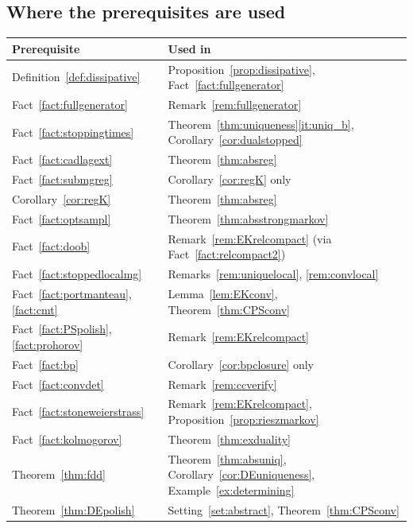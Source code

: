 \documentclass[11pt,a4paper]{article}
\theoremstyle{plain}
\theoremstyle{definition}
\theoremstyle{remark}
\begin{document}
\subsection{Where the prerequisites are used}
\label{ssec:usage}

\noindent
\begin{tabular}{@{}ll@{}}
\toprule
Prerequisite & Used in \\
\midrule
Definition~\ref{def:dissipative}
  & Proposition~\ref{prop:dissipative}, Fact~\ref{fact:fullgenerator} \\
Fact~\ref{fact:fullgenerator}
  & Remark~\ref{rem:fullgenerator} \\
Fact~\ref{fact:stoppingtimes}
  & Theorem~\ref{thm:uniqueness}\ref{it:uniq_b}, Corollary~\ref{cor:dualstopped} \\
Fact~\ref{fact:cadlagext}
  & Theorem~\ref{thm:absreg} \\
Fact~\ref{fact:submgreg}
  & Corollary~\ref{cor:regK} only \\
Corollary~\ref{cor:regK}
  & Theorem~\ref{thm:absreg} \\
Fact~\ref{fact:optsampl}
  & Theorem~\ref{thm:absstrongmarkov} \\
Fact~\ref{fact:doob}
  & Remark~\ref{rem:EKrelcompact} (via Fact~\ref{fact:relcompact2}) \\
Fact~\ref{fact:stoppedlocalmg}
  & Remarks~\ref{rem:uniquelocal}, \ref{rem:convlocal} \\
Fact~\ref{fact:portmanteau}, \ref{fact:cmt}
  & Lemma~\ref{lem:EKconv}, Theorem~\ref{thm:CPSconv} \\
Fact~\ref{fact:PSpolish}, \ref{fact:prohorov}
  & Remark~\ref{rem:EKrelcompact} \\
Fact~\ref{fact:bp}
  & Corollary~\ref{cor:bpclosure} only \\
Fact~\ref{fact:convdet}
  & Remark~\ref{rem:ccverify} \\
Fact~\ref{fact:stoneweierstrass}
  & Remark~\ref{rem:EKrelcompact}, Proposition~\ref{prop:rieszmarkov} \\
Fact~\ref{fact:kolmogorov}
  & Theorem~\ref{thm:exduality} \\
Theorem~\ref{thm:fdd}
  & Theorem~\ref{thm:absuniq}, Corollary~\ref{cor:DEuniqueness},
    Example~\ref{ex:determining} \\
Theorem~\ref{thm:DEpolish}
  & Setting~\ref{set:abstract}, Theorem~\ref{thm:CPSconv} \\

\end{tabular}
\end{document}
